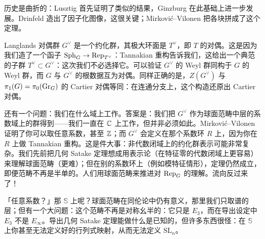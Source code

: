 历史是曲折的：Lusztig 首先证明了类似的结果，Ginzburg 在此基础上进一步发展。Drinfeld 造出了因子化图像，这很关键；Mirković–Vilonen 把各块拼成了这个定理。

Langlands 对偶群 $G^\vee$ 是一个约化群，其极大环面是 $T^\vee$，即 $T$ 的对偶。这是因为我们造了一个函子 $\mathrm{Sph}_G\to\operatorname{Rep}_{T^\vee}$：Tannakian 重构告诉我们，这给出一个典范的子群 $T^\vee\subset G^\vee$：这次我们不必选择它。可以验证 $G^\vee$ 的 Weyl 群同构于 $G$ 的 Weyl 群，而 $G$ 与 $G^\vee$ 的根数据互为对偶。同样正确的是，$Z(G^\vee)$ 与 $\pi_1(G)=\pi_0(\mathrm{Gr}_G)$ 的 Cartier 对偶等同：在连通分支上，这个构造还原出 Cartier 对偶。


还有一个问题：我们在什么域上工作。答案是：我们把 $G^\vee$ 作为球面范畴中层的系数域上的群得到——我们一直在 $\mathbb{C}$ 上工作，但并非必须如此。Mirković–Vilonen 证明了你可以取任意系数，甚至 $\mathbb{Z}$；而 $G^\vee$ 会定义在那个系数环 $R$ 上，因为你在 $R$ 上做 Tannakian 重构。这是件大事：非代数闭域上的约化群表示可能非常复杂。我们先前把几何 Satake 定理想成用表示论（在特征零的代数闭域上更容易）来理解球面范畴（更难）；但在别的系数环上（例如模特征情形），定理仍然成立，即便范畴不再是半单的。人们用球面范畴来推进对 $\operatorname{Rep}_G$ 的理解。流向反过来了！

\begin{remark}
「任意系数？」那 $\mathbb{S}$ 上呢？球面范畴在同伦论中仍有意义，那里我们只取谱的层；但有一个大问题：这个范畴不再是对称幺半的：它只是 $E_3$，而在导出设定中 $E_3$ 不是 $E_\infty$。导出几何 Satake 定理能做什么是已知的，但许多东西很怪：在 $\mathbb{S}$ 上你甚至无法定义好的行列式映射，从而无法定义 $\mathrm{SL}_n$。
\end{remark}
